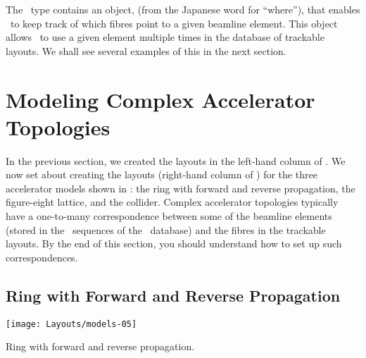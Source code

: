 %
The \PTC\ type  contains an object, 
(from the Japanese word for ``where''), that enables \PTC\ to
keep track of which fibres point to a given beamline element.
This object  allows \PTC\ to use a given element multiple
times in the database of trackable layouts. We shall see several
examples of this in the next section.



\section{Modeling Complex Accelerator Topologies}
\label{sec:model.topos}


%
In the previous section, we created the layouts in the left-hand
column of . We now set about creating the
layouts (right-hand column of ) for the three
accelerator models shown in : the ring with
forward and reverse propagation, the figure-eight lattice, and
the collider. Complex accelerator topologies typically have a
one-to-many correspondence between some of the beamline elements
(stored in the \DNA\ sequences of the \DNA\ database) and the
fibres in the trackable layouts. By the end of this section, you
should understand how to set up such correspondences.


\subsection{Ring with Forward and Reverse Propagation}

\begin{marginfigure}[4\baselineskip] \forceversofloat
  \texttt{[image: Layouts/models-05]}
  \caption{Ring with forward and reverse propagation.}
  \label{fig:fwd.rev.ring}
\end{marginfigure}

